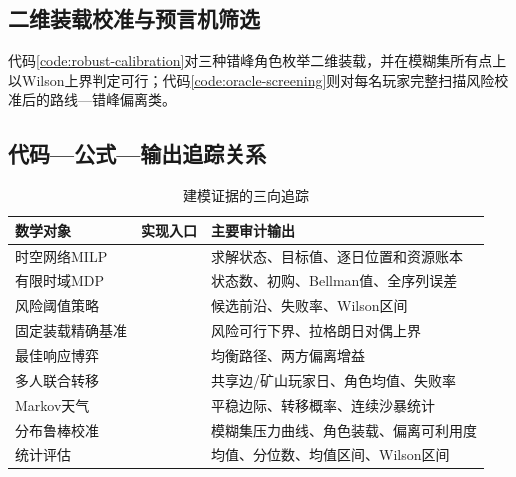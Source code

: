 \subsection{二维装载校准与预言机筛选}

代码\ref{code:robust-calibration}对三种错峰角色枚举二维装载，并在模糊集所有点上以Wilson上界判定可行；代码\ref{code:oracle-screening}则对每名玩家完整扫描风险校准后的路线—错峰偏离类。





\subsection{代码—公式—输出追踪关系}

\begin{table}[H]
\centering
\caption{建模证据的三向追踪}
\begin{tabularx}{0.96\textwidth}{L{2.8cm}L{3.3cm}Y}
\toprule
数学对象 & 实现入口 & 主要审计输出\\
\midrule
时空网络MILP &  & 求解状态、目标值、逐日位置和资源账本\\
有限时域MDP &  & 状态数、初购、Bellman值、全序列误差\\
风险阈值策略 &  & 候选前沿、失败率、Wilson区间\\
固定装载精确基准 &  & 风险可行下界、拉格朗日对偶上界\\
最佳响应博弈 &  & 均衡路径、两方偏离增益\\
多人联合转移 &  & 共享边/矿山玩家日、角色均值、失败率\\
Markov天气 &  & 平稳边际、转移概率、连续沙暴统计\\
分布鲁棒校准 &  & 模糊集压力曲线、角色装载、偏离可利用度\\
统计评估 &  & 均值、分位数、均值区间、Wilson区间\\
\bottomrule
\end{tabularx}
\end{table}
